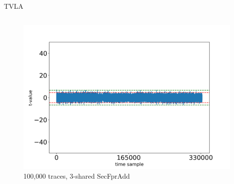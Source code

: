 \begin{frame}{TVLA}
\begin{columns}[T]
\begin{figure}
\includegraphics[width=\textwidth]{figure/tvla/SecFprAdd_3shares_100k.png}
\vspace{-20pt}
\caption{100,000 traces, 3-shared SecFprAdd}
\end{figure}

\end{columns}


\end{frame}


%
%
%



